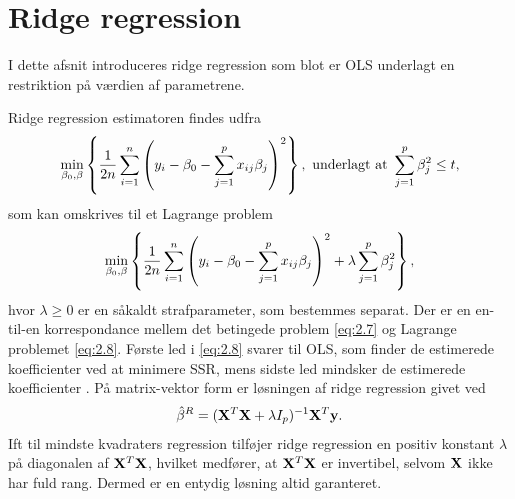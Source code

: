 \section{Ridge regression}
I dette afsnit introduceres ridge regression som blot er OLS underlagt en restriktion på værdien af parametrene.

Ridge regression estimatoren findes udfra
\begin{align}
\min_{\beta_0, \beta} \cbr{\frac{1}{2n} \sum_{i=1}^n \del{y_i - \beta_0 - \sum_{j=1}^p x_{ij} \beta_j}^2}, \ \text{underlagt at } \sum_{j=1}^p \beta_j^2 \leq t, \label{eq:2.7}
\end{align}
som kan omskrives til et Lagrange problem
\begin{align}
\min_{\beta_0, \beta} \cbr{\frac{1}{2n} \sum_{i=1}^n \del{y_i - \beta_0 - \sum_{j=1}^p x_{ij} \beta_j}^2 + \lambda \sum_{j=1}^p \beta_j^2},
\end{align} \label{eq:2.8}
hvor $\lambda \geq 0$ er en såkaldt strafparameter, som bestemmes separat.
Der er en en-til-en korrespondance mellem det betingede problem \eqref{eq:2.7} og Lagrange problemet \eqref{eq:2.8}.
Første led i \eqref{eq:2.8} svarer til OLS, som finder de estimerede koefficienter ved at minimere SSR, mens sidste led mindsker de estimerede koefficienter .
På matrix-vektor form er løsningen af ridge regression givet ved
\begin{align*}
\hat{\beta}^R = (\mathbf{X}^T \mathbf{X} + \lambda I_p)^{-1} \mathbf{X}^T \mathbf{y}.
\end{align*} 
Ift til mindste kvadraters regression tilføjer ridge regression en positiv konstant $\lambda$ på diagonalen af $\mathbf{X}^T \mathbf{X}$, hvilket medfører, at \(\mathbf{X}^T \mathbf{X}\) er invertibel, selvom $\mathbf{X}$ ikke har fuld rang.
Dermed er en entydig løsning altid garanteret.